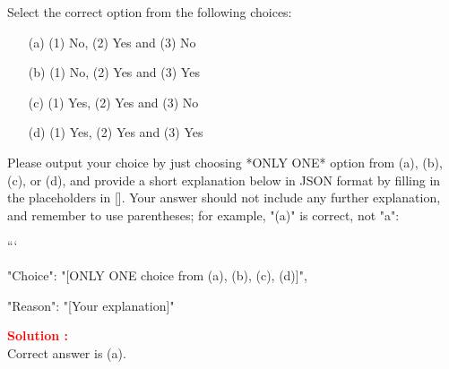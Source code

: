 \documentclass[12pt]{article}
\begin{document}
Select the correct option from the following choices:
\begin{enumerate}
    \item [(a)] (1) No, (2) Yes and (3) No
    \item [(b)] (1) No, (2) Yes and (3) Yes
    \item [(c)] (1) Yes, (2) Yes and (3) No
    \item [(d)] (1) Yes, (2) Yes and (3) Yes
\end{enumerate}

Please output your choice by just choosing *ONLY ONE* option from (a), (b), (c), or (d), and provide a short explanation below in JSON format by filling in the placeholders in []. Your answer should not include any further explanation, and remember to use parentheses; for example, "(a)" is correct, not "a": 

```
{

"Choice": "[ONLY ONE choice from (a), (b), (c), (d)]",

"Reason": "[Your explanation]"

}


\textbf{\textcolor{red}{Solution :}} \\
Correct answer is (a).\\
\end{document}
